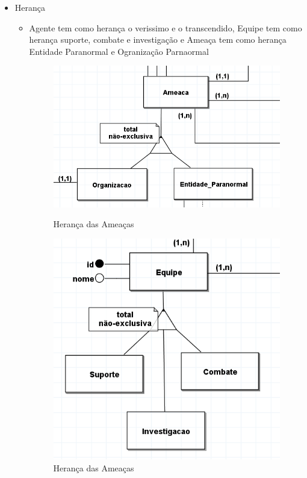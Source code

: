 \documentclass[12pt,a4paper]{report}
\begin{document}
\begin{itemize}
\begin{itemize}
        \item Herança
        \begin{itemize}
            \item Agente tem como herança o verissimo e o transcendido, Equipe tem como herança suporte, combate e investigação e Ameaça tem como herança Entidade Paranormal e Ogranização Parnaormal
            \begin{figure}[H]
                \centering
                \begin{minipage}[b]{0.45\linewidth}
                \centering
                \includegraphics[width=\linewidth]{heranca_ameaca.png}
                \caption{Herança das Ameaças}
                \label{fig:herança-ameaças}
            \end{minipage}
            \hfill
                \begin{minipage}[b]{0.45\linewidth}
                \centering
                \includegraphics[width=\linewidth]{heranca_equipe.png}
                \caption{Herança das Ameaças}
                \label{fig:herence-threats}
            \end{minipage}
            \end{figure}
        \end{itemize}


\end{itemize}
\end{itemize}
\end{document}
